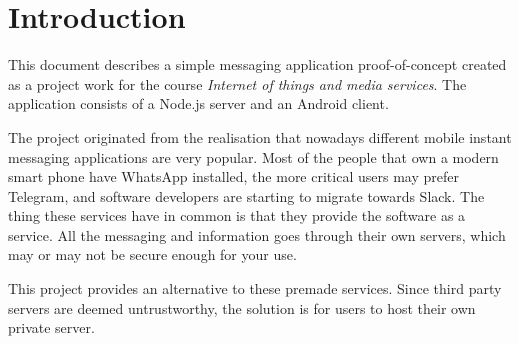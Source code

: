 
\section{Introduction}
This document describes a simple messaging application proof-of-concept created as a project work for the course \emph{Internet of things and media services}. The application consists of a Node.js server and an Android client.

The project originated from the realisation that nowadays different mobile instant messaging applications are very popular. Most of the people that own a modern smart phone have WhatsApp installed, the more critical users may prefer Telegram, and software developers are starting to migrate towards Slack. The thing these services have in common is that they provide the software as a service. All the messaging and information goes through their own servers, which may or may not be secure enough for your use.

This project provides an alternative to these premade services. Since third party servers are deemed untrustworthy, the solution is for users to host their own private server.
